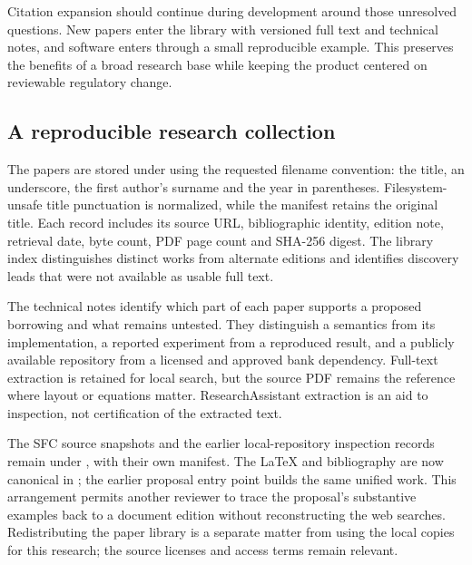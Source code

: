 
Citation expansion should continue during development around those unresolved
questions. New papers enter the library with versioned full text and technical
notes, and software enters through a small reproducible example. This preserves
the benefits of a broad research base while keeping the product centered on
reviewable regulatory change.

\subsection{A reproducible research collection}
\label{merge:P-05-evidence:02}


The papers are stored under  using the requested filename
convention: the title, an underscore, the first author's surname and the year in
parentheses. Filesystem-unsafe title punctuation is normalized, while the manifest
retains the original title. Each
record includes its source URL, bibliographic identity, edition note, retrieval
date, byte count, PDF page count and SHA-256 digest. The library index distinguishes
distinct works from alternate editions and identifies discovery leads that were
not available as usable full text.

The technical notes identify which part of each paper supports a proposed
borrowing and what remains untested. They distinguish a semantics from its
implementation, a reported experiment from a reproduced result, and a publicly
available repository from a licensed and approved bank dependency. Full-text
extraction is retained for local search, but the source PDF remains the reference
where layout or equations matter. ResearchAssistant extraction is an aid to
inspection, not certification of the extracted text.


The SFC source snapshots and the earlier local-repository inspection records
remain under , with their own manifest. The LaTeX and
bibliography are now canonical in ; the earlier
proposal entry point builds the same unified work. This arrangement permits another
reviewer to trace the proposal's substantive examples back to a document edition
without reconstructing the web searches. Redistributing the paper library is a
separate matter from using the local copies for this research; the source licenses
and access terms remain relevant.

